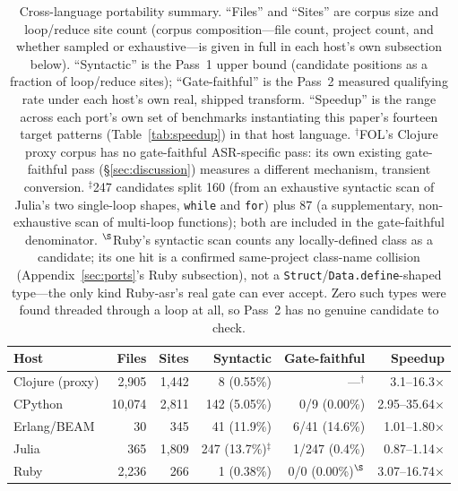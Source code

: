 \documentclass[sigplan,screen,review,anonymous]{acmart}
\begin{document}
\begin{table}
  \caption{Cross-language portability summary. ``Files'' and ``Sites''
  are corpus size and loop/reduce site count (corpus composition---file
  count, project count, and whether sampled or exhaustive---is given in
  full in each host's own subsection below). ``Syntactic'' is the
  Pass~1 upper bound (candidate positions as a fraction of loop/reduce
  sites); ``Gate-faithful'' is the Pass~2 measured qualifying rate
  under each host's own real, shipped transform. ``Speedup'' is the
  range across each port's own set of benchmarks instantiating this
  paper's fourteen target patterns (Table~\ref{tab:speedup}) in that
  host language. $^\dagger$FOL's Clojure proxy corpus has no
  gate-faithful ASR-specific pass: its own existing gate-faithful pass
  (\S\ref{sec:discussion}) measures a different mechanism, transient
  conversion. $^\ddagger$247 candidates split 160 (from an exhaustive
  syntactic scan of Julia's two single-loop shapes, \texttt{while} and
  \texttt{for}) plus 87 (a supplementary, non-exhaustive scan of
  multi-loop functions); both are included in the gate-faithful
  denominator. $^\S$Ruby's syntactic scan counts any locally-defined
  class as a candidate; its one hit is a confirmed same-project
  class-name collision (Appendix~\ref{sec:ports}'s Ruby subsection), not
  a \texttt{Struct}/\texttt{Data.define}-shaped type---the only kind
  Ruby-asr's real gate can ever accept. Zero such types were found
  threaded through a loop at all, so Pass~2 has no genuine candidate to
  check.}
  \label{tab:ports}
  \footnotesize
  \setlength{\tabcolsep}{3pt}
  \begin{tabular}{lrrrrr}
    \toprule
    Host & Files & Sites & Syntactic & Gate-faithful & Speedup \\
    \midrule
    Clojure (proxy) & 2{,}905 & 1{,}442 & 8 (0.55\%) & ---$^\dagger$ & 3.1--16.3$\times$ \\
    CPython & 10{,}074 & 2{,}811 & 142 (5.05\%) & 0/9 (0.00\%) & 2.95--35.64$\times$ \\
    Erlang/BEAM & 30 & 345 & 41 (11.9\%) & 6/41 (14.6\%) & 1.01--1.80$\times$ \\
    Julia & 365 & 1{,}809 & 247 (13.7\%)$^\ddagger$ & 1/247 (0.4\%) & 0.87--1.14$\times$ \\
    Ruby & 2{,}236 & 266 & 1 (0.38\%) & 0/0 (0.00\%)$^\S$ & 3.07--16.74$\times$ \\
    \bottomrule
  \end{tabular}
\end{table}
\end{document}
